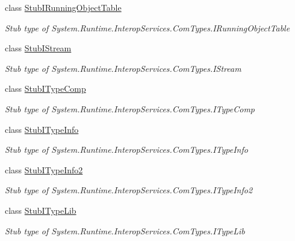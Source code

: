 \begin{DoxyCompactItemize}
class \hyperlink{class_system_1_1_runtime_1_1_interop_services_1_1_com_types_1_1_fakes_1_1_stub_i_running_object_table}{Stub\-I\-Running\-Object\-Table}
\begin{DoxyCompactList}\small\item\em Stub type of System.\-Runtime.\-Interop\-Services.\-Com\-Types.\-I\-Running\-Object\-Table\end{DoxyCompactList}\item 
class \hyperlink{class_system_1_1_runtime_1_1_interop_services_1_1_com_types_1_1_fakes_1_1_stub_i_stream}{Stub\-I\-Stream}
\begin{DoxyCompactList}\small\item\em Stub type of System.\-Runtime.\-Interop\-Services.\-Com\-Types.\-I\-Stream\end{DoxyCompactList}\item 
class \hyperlink{class_system_1_1_runtime_1_1_interop_services_1_1_com_types_1_1_fakes_1_1_stub_i_type_comp}{Stub\-I\-Type\-Comp}
\begin{DoxyCompactList}\small\item\em Stub type of System.\-Runtime.\-Interop\-Services.\-Com\-Types.\-I\-Type\-Comp\end{DoxyCompactList}\item 
class \hyperlink{class_system_1_1_runtime_1_1_interop_services_1_1_com_types_1_1_fakes_1_1_stub_i_type_info}{Stub\-I\-Type\-Info}
\begin{DoxyCompactList}\small\item\em Stub type of System.\-Runtime.\-Interop\-Services.\-Com\-Types.\-I\-Type\-Info\end{DoxyCompactList}\item 
class \hyperlink{class_system_1_1_runtime_1_1_interop_services_1_1_com_types_1_1_fakes_1_1_stub_i_type_info2}{Stub\-I\-Type\-Info2}
\begin{DoxyCompactList}\small\item\em Stub type of System.\-Runtime.\-Interop\-Services.\-Com\-Types.\-I\-Type\-Info2\end{DoxyCompactList}\item 
class \hyperlink{class_system_1_1_runtime_1_1_interop_services_1_1_com_types_1_1_fakes_1_1_stub_i_type_lib}{Stub\-I\-Type\-Lib}
\begin{DoxyCompactList}\small\item\em Stub type of System.\-Runtime.\-Interop\-Services.\-Com\-Types.\-I\-Type\-Lib\end{DoxyCompactList}\item 

\end{DoxyCompactItemize}
